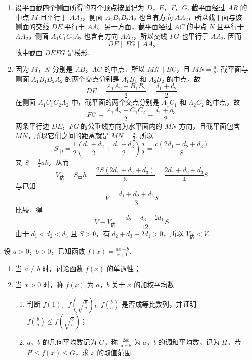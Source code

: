 \begin{solution}
\begin{enumerate}
\item 设平面截四个侧面所得的四个顶点按图记为 \(D\)，\(E\)，\(F\)，\(G\). 截平面经过 \(AB\) 的中点 \(M\) 且平行于 \(AA_2\)，侧面 \(A_1B_1B_2A_2\) 也含有方向 \(AA_2\)，所以截平面与该侧面的交线 \(DE\) 平行于 \(AA_2\). 另一方面，截平面经过 \(AC\) 的中点 \(N\) 且平行于 \(AA_2\)，侧面 \(A_1C_1C_2A_2\) 也含有方向 \(AA_2\)，所以交线 \(FG\) 也平行于 \(AA_2\). 因而
\[
 DE\parallel FG\parallel AA_2
\]
故中截面 \(DEFG\) 是梯形.

\item 因为 \(M\)，\(N\) 分别是 \(AB\)，\(AC\) 的中点，所以 \(MN\parallel BC\)，且 \(MN=\frac a2\). 截平面与侧面 \(A_1B_1B_2A_2\) 的两个交点分别是 \(A_1B_1\) 和 \(A_2B_2\) 的中点，故
\[
 DE=\frac{A_1A_2+B_1B_2}{2}=\frac{d_1+d_2}{2}
\]
在侧面 \(A_1C_1C_2A_2\) 中，截平面的两个交点分别是 \(A_1C_1\) 和 \(A_2C_2\) 的中点，故
\[
 FG=\frac{A_1A_2+C_1C_2}{2}=\frac{d_1+d_3}{2}
\]
两条平行边 \(DE\)，\(FG\) 的公垂线方向为水平面内的 \(MN\) 方向，且截平面包含 \(MN\)，所以它们之间的距离就是
\(MN=\frac a2\).
所以
\[
 S_{\text{中}}=\frac12\left(\frac{d_1+d_2}{2}+\frac{d_1+d_3}{2}\right)\frac a2
 =\frac{a(2d_1+d_2+d_3)}8
\]
又 \(S=\frac12ah\)，从而
\[
 V_{\text{估}}=S_{\text{中}}h
 =\frac{2S(2d_1+d_2+d_3)}8
 =\frac{2d_1+d_2+d_3}{4}S
\]
与已知
\[
 V=\frac{d_1+d_2+d_3}{3}S
\]
比较，得
\[
 V-V_{\text{估}}=\frac{d_2+d_3-2d_1}{12}S
\]
由于 \(d_1<d_2<d_3\) 且 \(S>0\)，有 \(d_2+d_3-2d_1>0\)，所以 \(V_{\text{估}}<V\).
\end{enumerate}
\end{solution}

\begin{problem}
设 \(a>0\)，\(b>0\)，已知函数 \(f(x)=\frac{ax+b}{x+1}\).

\begin{enumerate}
\item 当 \(a\neq b\) 时，讨论函数 \(f(x)\) 的单调性；
\item 当 \(x>0\) 时，称 \(f(x)\) 为 \(a\)，\(b\) 关于 \(x\) 的加权平均数.
\begin{enumerate}
\item 判断 \(f(1)\)，\(f\left(\sqrt{\frac{b}{a}}\right)\)，\(f\left(\frac{b}{a}\right)\) 是否成等比数列，并证明 \(f\left(\frac{b}{a}\right)\leqslant f\left(\sqrt{\frac{b}{a}}\right)\)；
\item \(a\)，\(b\) 的几何平均数记为 \(G\)，称 \(\frac{2ab}{a+b}\) 为 \(a\)，\(b\) 的调和平均数，记为 \(H\)，若 \(H\leqslant f(x)\leqslant G\)，求 \(x\) 的取值范围.
\end{enumerate}
\end{enumerate}
\end{problem}

